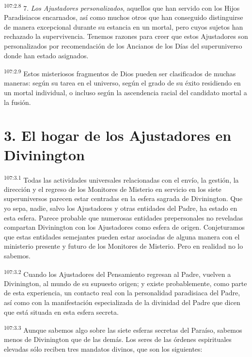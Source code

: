 \documentclass[twoside, 11pt]{book}
\begin{document}
\par
\textsuperscript{107:2.8} 7. \textit{Los Ajustadores personalizados}, aquellos que han servido con los Hijos Paradisiacos encarnados, así como muchos otros que han conseguido distinguirse de manera excepcional durante su estancia en un mortal, pero cuyos sujetos han rechazado la supervivencia. Tenemos razones para creer que estos Ajustadores son personalizados por recomendación de los Ancianos de los Días del superuniverso donde han estado asignados.

\par
\textsuperscript{107:2.9} Estos misteriosos fragmentos de Dios pueden ser clasificados de muchas maneras: según su tarea en el universo, según el grado de su éxito residiendo en un mortal individual, o incluso según la ascendencia racial del candidato mortal a la fusión.

\section*{3. El hogar de los Ajustadores en Divinington}
\par
\textsuperscript{107:3.1} Todas las actividades universales relacionadas con el envío, la gestión, la dirección y el regreso de los Monitores de Misterio en servicio en los siete superuniversos parecen estar centradas en la esfera sagrada de Divinington. Que yo sepa, nadie, salvo los Ajustadores y otras entidades del Padre, ha estado en esta esfera. Parece probable que numerosas entidades prepersonales no reveladas compartan Divinington con los Ajustadores como esfera de origen. Conjeturamos que estas entidades semejantes pueden estar asociadas de alguna manera con el ministerio presente y futuro de los Monitores de Misterio. Pero en realidad no lo sabemos.

\par
\textsuperscript{107:3.2} Cuando los Ajustadores del Pensamiento regresan al Padre, vuelven a Divinington, al mundo de su supuesto origen; y existe probablemente, como parte de esta experiencia, un contacto real con la personalidad paradisiaca del Padre, así como con la manifestación especializada de la divinidad del Padre que dicen que está situada en esta esfera secreta.

\par
\textsuperscript{107:3.3} Aunque sabemos algo sobre las siete esferas secretas del Paraíso, sabemos menos de Divinington que de las demás. Los seres de las órdenes espirituales elevadas sólo reciben tres mandatos divinos, que son los siguientes:
\end{document}
